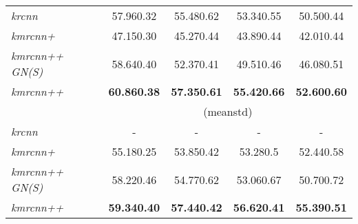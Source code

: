 \begin{table}[t!]
{\begin{tabular}{l|cccc}
			\hline
			\emph{krcnn}            & 57.960.32                                                                                        & 55.480.62          & 53.340.55          & 50.500.44  \Tstrut                     \\
			\emph{kmrcnn+}          & 47.150.30                                                                                        & 45.270.44          & 43.890.44          & 42.010.44                      \Tstrut \\
			\emph{kmrcnn++ GN(S)}   & 58.640.40                                                                                        & 52.370.41          & 49.510.46          & 46.080.51 \Tstrut                      \\\hline
			\emph{kmrcnn++}         & \textbf{60.860.38}                                                                               & \textbf{57.350.61} & \textbf{55.420.66} & \textbf{52.600.60} \Tstrut             \\
			\hline
			                        & \multicolumn{4}{c}{ (meanstd)} \Tstrut \Bstrut                                                                                                   \\
			\hline
			\emph{krcnn}            & -                                                                                                     & -                       & -                       & - \Tstrut                                   \\
			\emph{kmrcnn+}          & 55.180.25                                                                                        & 53.850.42          & 53.280.5           & 52.440.58 \Tstrut                      \\
			\emph{kmrcnn++ GN(S)}   & 58.220.46                                                                                        & 54.770.62          & 53.060.67          & 50.700.72 \Tstrut                      \\\hline
			\emph{kmrcnn++}         & \textbf{59.340.40}                                                                               & \textbf{57.440.42} & \textbf{56.620.41} & \textbf{55.390.51} \Tstrut             \\
			\hline
		\end{tabular}
	}
	\label{table:splitgn-design}
	\vspace{-1mm}
\end{table}
